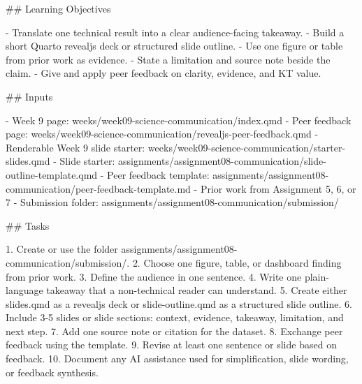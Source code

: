 \documentclass[
  letterpaper,
  DIV=11,
  numbers=noendperiod,
  oneside]{scrreprt}
\newenvironment{Shaded}{\begin{snugshade}}{\end{snugshade}}
\newcommand{\FunctionTok}[1]{\textcolor[rgb]{0.28,0.35,0.67}{#1}}
\newcommand{\InformationTok}[1]{\textcolor[rgb]{0.37,0.37,0.37}{#1}}
\newcommand{\NormalTok}[1]{\textcolor[rgb]{0.00,0.23,0.31}{#1}}
\newcommand{\SpecialStringTok}[1]{\textcolor[rgb]{0.13,0.47,0.30}{#1}}
\begin{document}
\begin{Shaded}
\begin{Highlighting}[numbers=left,,]
\FunctionTok{\#\# Learning Objectives}

\SpecialStringTok{{-} }\NormalTok{Translate one technical result into a clear audience{-}facing takeaway.}
\SpecialStringTok{{-} }\NormalTok{Build a short Quarto revealjs deck or structured slide outline.}
\SpecialStringTok{{-} }\NormalTok{Use one figure or table from prior work as evidence.}
\SpecialStringTok{{-} }\NormalTok{State a limitation and source note beside the claim.}
\SpecialStringTok{{-} }\NormalTok{Give and apply peer feedback on clarity, evidence, and KT value.}

\FunctionTok{\#\# Inputs}

\SpecialStringTok{{-} }\NormalTok{Week 9 page: }\InformationTok{\textasciigrave{}weeks/week09{-}science{-}communication/index.qmd\textasciigrave{}}
\SpecialStringTok{{-} }\NormalTok{Peer feedback page: }\InformationTok{\textasciigrave{}weeks/week09{-}science{-}communication/revealjs{-}peer{-}feedback.qmd\textasciigrave{}}
\SpecialStringTok{{-} }\NormalTok{Renderable Week 9 slide starter: }\InformationTok{\textasciigrave{}weeks/week09{-}science{-}communication/starter{-}slides.qmd\textasciigrave{}}
\SpecialStringTok{{-} }\NormalTok{Slide starter: }\InformationTok{\textasciigrave{}assignments/assignment08{-}communication/slide{-}outline{-}template.qmd\textasciigrave{}}
\SpecialStringTok{{-} }\NormalTok{Peer feedback template: }\InformationTok{\textasciigrave{}assignments/assignment08{-}communication/peer{-}feedback{-}template.md\textasciigrave{}}
\SpecialStringTok{{-} }\NormalTok{Prior work from Assignment 5, 6, or 7}
\SpecialStringTok{{-} }\NormalTok{Submission folder: }\InformationTok{\textasciigrave{}assignments/assignment08{-}communication/submission/\textasciigrave{}}

\FunctionTok{\#\# Tasks}

\SpecialStringTok{1. }\NormalTok{Create or use the folder }\InformationTok{\textasciigrave{}assignments/assignment08{-}communication/submission/\textasciigrave{}}\NormalTok{.}
\SpecialStringTok{2. }\NormalTok{Choose one figure, table, or dashboard finding from prior work.}
\SpecialStringTok{3. }\NormalTok{Define the audience in one sentence.}
\SpecialStringTok{4. }\NormalTok{Write one plain{-}language takeaway that a non{-}technical reader can understand.}
\SpecialStringTok{5. }\NormalTok{Create either }\InformationTok{\textasciigrave{}slides.qmd\textasciigrave{}}\NormalTok{ as a revealjs deck or }\InformationTok{\textasciigrave{}slide{-}outline.qmd\textasciigrave{}}\NormalTok{ as a structured slide outline.}
\SpecialStringTok{6. }\NormalTok{Include 3{-}5 slides or slide sections: context, evidence, takeaway, limitation, and next step.}
\SpecialStringTok{7. }\NormalTok{Add one source note or citation for the dataset.}
\SpecialStringTok{8. }\NormalTok{Exchange peer feedback using the template.}
\SpecialStringTok{9. }\NormalTok{Revise at least one sentence or slide based on feedback.}
\SpecialStringTok{10. }\NormalTok{Document any AI assistance used for simplification, slide wording, or feedback synthesis.}


\end{Highlighting}
\end{Shaded}
\end{document}
